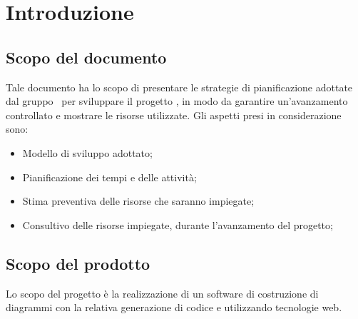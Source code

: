 \documentclass[../PianoDiProgetto.tex]{subfiles}
\begin{document}
	\section{Introduzione}
		\subsection{Scopo del documento}
			Tale documento ha lo scopo di presentare le strategie di pianificazione adottate
			dal gruppo \kaleidoscode\  per sviluppare il progetto \progetto, in modo	da garantire un'avanzamento controllato e mostrare le risorse utilizzate.
			Gli aspetti presi in considerazione sono:
			\begin{itemize}
				\item Modello di sviluppo adottato;
				\item Pianificazione dei tempi e delle attività;
				\item Stima preventiva delle risorse che saranno impiegate;
				\item Consultivo delle risorse impiegate, durante l'avanzamento del progetto;
			\end{itemize}
		\subsection{Scopo del prodotto}
			Lo scopo del progetto è la realizzazione di un software di
			costruzione di diagrammi  con la relativa generazione
			di codice  e  utilizzando tecnologie
			web.
\end{document}
